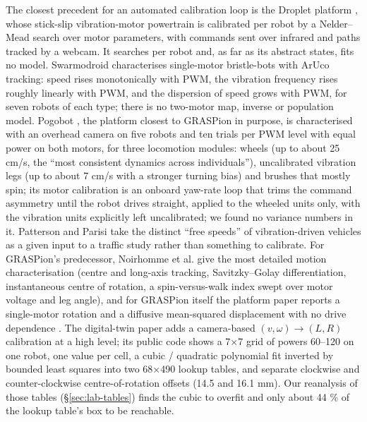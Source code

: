 The closest precedent for an automated calibration loop is the Droplet
platform \cite{klingner2014droplet}, whose stick-slip vibration-motor
powertrain is calibrated per robot by a Nelder--Mead search over motor
parameters, with commands sent over infrared and paths tracked by a
webcam. It searches per robot and, as far as its abstract states, fits
no model. Swarmodroid
\cite{dmitriev2023swarmodroid} characterises single-motor bristle-bots
with ArUco tracking: speed rises monotonically with PWM, the vibration
frequency rises roughly linearly with PWM, and the dispersion of speed
grows with PWM, for seven robots of each type; there is no two-motor
map, inverse or population model. Pogobot \cite{loi2025pogobot}, the
platform closest to GRASPion in purpose, is characterised with an
overhead camera on five robots and ten trials per PWM level with equal
power on both motors, for three locomotion modules: wheels (up to about
25 cm/s, the ``most consistent dynamics across individuals''),
uncalibrated vibration legs (up to about 7 cm/s with a stronger turning
bias) and brushes that mostly spin; its motor calibration is an onboard
yaw-rate loop that trims the command asymmetry until the robot drives
straight, applied to the wheeled units only, with the vibration units
explicitly left uncalibrated; we found no variance numbers in it.
Patterson and Parisi \cite{patterson2023fundamental} take the distinct
``free speeds'' of vibration-driven vehicles as a given input to a
traffic study rather than something to calibrate. For GRASPion's
predecessor, Noirhomme et al. \cite{noirhomme2025brainbots} give the
most detailed motion characterisation (centre and long-axis tracking,
Savitzky--Golay differentiation, instantaneous centre of rotation, a
spin-versus-walk index swept over motor voltage and leg angle), and for
GRASPion itself the platform paper reports a single-motor rotation and a
diffusive mean-squared displacement with no drive dependence
\cite{novkoski2026graspion}. The digital-twin paper
\cite{mammadli2026twin} adds a camera-based \((v,\omega)\to(L,R)\)
calibration at a high level; its public code shows a 7×7 grid of powers
60--120 on one robot, one value per cell, a cubic / quadratic polynomial
fit inverted by bounded least squares into two 68×490 lookup tables, and
separate clockwise and counter-clockwise centre-of-rotation offsets
(14.5 and 16.1 mm). Our reanalysis of those tables (§\ref{sec:lab-tables}) finds the
cubic to overfit and only about 44 \% of the lookup table's box to be
reachable.

